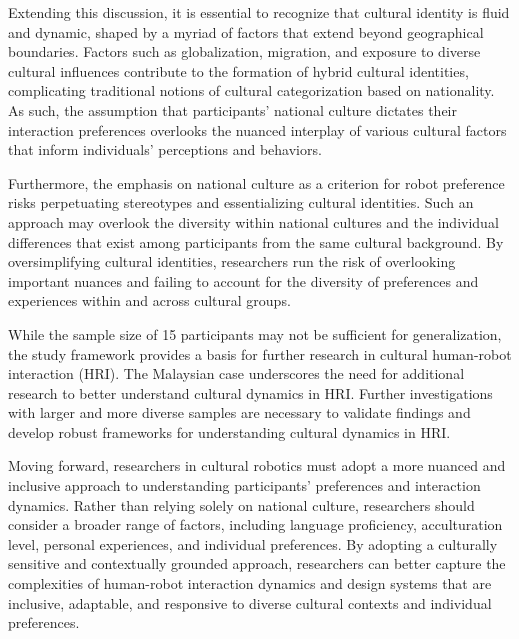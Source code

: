 Extending this discussion, it is essential to recognize that cultural identity is fluid and dynamic, shaped by a myriad of factors that extend beyond geographical boundaries. Factors such as globalization, migration, and exposure to diverse cultural influences contribute to the formation of hybrid cultural identities, complicating traditional notions of cultural categorization based on nationality. As such, the assumption that participants' national culture dictates their interaction preferences overlooks the nuanced interplay of various cultural factors that inform individuals' perceptions and behaviors.

Furthermore, the emphasis on national culture as a criterion for robot preference risks perpetuating stereotypes and essentializing cultural identities. Such an approach may overlook the diversity within national cultures and the individual differences that exist among participants from the same cultural background. By oversimplifying cultural identities, researchers run the risk of overlooking important nuances and failing to account for the diversity of preferences and experiences within and across cultural groups.

While the sample size of 15 participants may not be sufficient for generalization, the study framework provides a basis for further research in cultural human-robot interaction (HRI). The Malaysian case underscores the need for additional research to better understand cultural dynamics in HRI. Further investigations with larger and more diverse samples are necessary to validate findings and develop robust frameworks for understanding cultural dynamics in HRI.

Moving forward, researchers in cultural robotics must adopt a more nuanced and inclusive approach to understanding participants' preferences and interaction dynamics. Rather than relying solely on national culture, researchers should consider a broader range of factors, including language proficiency, acculturation level, personal experiences, and individual preferences. By adopting a culturally sensitive and contextually grounded approach, researchers can better capture the complexities of human-robot interaction dynamics and design systems that are inclusive, adaptable, and responsive to diverse cultural contexts and individual preferences.
